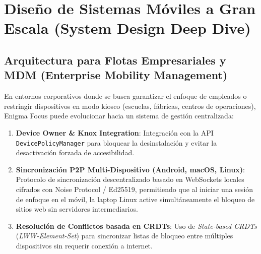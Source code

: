 \documentclass[11pt,a4paper,oneside]{report}
\begin{document}
\newpage

\chapter[System Design Deep Dive]{Diseño de Sistemas Móviles a Gran Escala (System Design Deep Dive)}

\section{Arquitectura para Flotas Empresariales y MDM (Enterprise Mobility Management)}
En entornos corporativos donde se busca garantizar el enfoque de empleados o restringir dispositivos en modo kiosco (escuelas, fábricas, centros de operaciones), Enigma Focus puede evolucionar hacia un sistema de gestión centralizada:

\begin{enumerate}
    \item \textbf{Device Owner \& Knox Integration}: Integración con la API \texttt{DevicePolicyManager} para bloquear la desinstalación y evitar la desactivación forzada de accesibilidad.
    \item \textbf{Sincronización P2P Multi-Dispositivo (Android, macOS, Linux)}: Protocolo de sincronización descentralizado basado en WebSockets locales cifrados con Noise Protocol / Ed25519, permitiendo que al iniciar una sesión de enfoque en el móvil, la laptop Linux active simultáneamente el bloqueo de sitios web sin servidores intermediarios.
    \item \textbf{Resolución de Conflictos basada en CRDTs}: Uso de \textit{State-based CRDTs} (\textit{LWW-Element-Set}) para sincronizar listas de bloqueo entre múltiples dispositivos sin requerir conexión a internet.
\end{enumerate}
\end{document}
